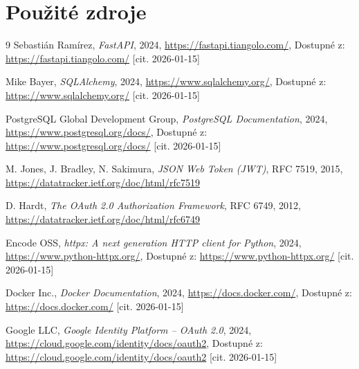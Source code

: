 \documentclass[12pt,a4paper]{article}
\begin{document}
\section*{Použité zdroje}
\begingroup
\renewcommand{\section}[2]{}%
\begin{thebibliography}{9}
Sebastián Ramírez,
\textit{FastAPI},
2024,
\url{https://fastapi.tiangolo.com/},
Dostupné z: \url{https://fastapi.tiangolo.com/} [cit. 2026-01-15]

Mike Bayer,
\textit{SQLAlchemy},
2024,
\url{https://www.sqlalchemy.org/},
Dostupné z: \url{https://www.sqlalchemy.org/} [cit. 2026-01-15]

PostgreSQL Global Development Group,
\textit{PostgreSQL Documentation},
2024,
\url{https://www.postgresql.org/docs/},
Dostupné z: \url{https://www.postgresql.org/docs/} [cit. 2026-01-15]

M. Jones, J. Bradley, N. Sakimura,
\textit{JSON Web Token (JWT)},
RFC 7519,
2015,
\url{https://datatracker.ietf.org/doc/html/rfc7519}

D. Hardt,
\textit{The OAuth 2.0 Authorization Framework},
RFC 6749,
2012,
\url{https://datatracker.ietf.org/doc/html/rfc6749}

Encode OSS,
\textit{httpx: A next generation HTTP client for Python},
2024,
\url{https://www.python-httpx.org/},
Dostupné z: \url{https://www.python-httpx.org/} [cit. 2026-01-15]

Docker Inc.,
\textit{Docker Documentation},
2024,
\url{https://docs.docker.com/},
Dostupné z: \url{https://docs.docker.com/} [cit. 2026-01-15]

Google LLC,
\textit{Google Identity Platform – OAuth 2.0},
2024,
\url{https://cloud.google.com/identity/docs/oauth2},
Dostupné z: \url{https://cloud.google.com/identity/docs/oauth2} [cit. 2026-01-15]

\end{thebibliography}
\endgroup
\end{document}

